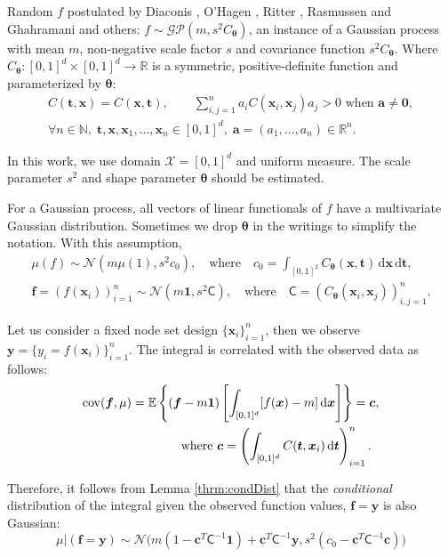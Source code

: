 \documentclass[twocolumn]{svjour3}          %
\newcommand{\bm}[1]{\boldsymbol{#1}}
\newcommand{\dif}[1]{\text{d}{#1}}
\newcommand{\D}[1]{\text{d}{#1}}
\newcommand{\Ex}{\mathbb{E}}
\newcommand{\vtheta}{{\bm{\theta}}}
\newcommand{\va}{\bm{a}}
\newcommand{\vc}{\bm{c}}
\newcommand{\vf}{\bm{f}}
\newcommand{\vt}{\bm{t}}
\newcommand{\vx}{\bm{x}}
\newcommand{\vy}{\bm{y}}
\newcommand{\vzero}{\bm{0}}
\newcommand{\vone}{\bm{1}}
\newcommand{\mC}{\mathsf{C}}
\newcommand{\cov}{{\textup{cov}}}
\newcommand{\calN}{\mathcal{N}}
\begin{document}
Random $f$ postulated by Diaconis \cite{DiaconisBayesian}, O'Hagen \cite{HagenBayes}, Ritter \cite{RiterAverage}, Rasmussen and Ghahramani \cite{RasmussenBayesian} and others: $f \sim \mathcal{GP}(m,s^2 C_\vtheta)$, an instance of a Gaussian process with mean $m$, non-negative scale factor $s$ and covariance function $s^2C_\vtheta$. Where $C_\vtheta: [0,1]^d \times [0,1]^d \to \mathbb{R} $ is a symmetric, positive-definite function and parameterized by $\vtheta$:
\begin{multline} \label{FJH:eq:CondPosDef}
C(\vt,\vx)  = C(\vx, \vt),  \qquad \sum_{i,j = 1}^n a_iC(\vx_i,\vx_j) a_j  
> 0 \text{ when } \va \ne \vzero, \\
\forall n\in \mathbb{N}, \; \vt, \vx, \vx_1, \ldots, \vx_n \in [0,1]^d, \; \va = (a_1, \ldots, a_n) \in \mathbb{R}^n.
\end{multline}

In this work, we use domain $\mathcal{X} = [0,1]^d$ and uniform measure.  The scale parameter $s^2$ and shape parameter $\vtheta$ should be estimated.

For a Gaussian process, all vectors of linear functionals of $f$ have a multivariate Gaussian distribution. Sometimes we drop $\vtheta$ in the writings to simplify the notation. With this assumption,
\begin{subequations}
\begin{align}
\mu(f) \sim \calN(m \mu(1), s^2 c_0), 
\quad\text{where}\quad
c_0 = \int_{[0,1]^2} C_\vtheta(\vx,\vt) \, \dif{\vx} \, \dif{\vt},
\\
\label{eqn:fGaussDist}
\vf  = \left( f(\vx_i)\right)_{i=1}^n \sim \calN(m \vone, s^2 \mC), 
\quad\text{where}\quad
\mC = \left(  C_\vtheta(\vx_i,\vx_j)  \right)_{i,j=1}^n.
\end{align}
\end{subequations}

Let us consider a fixed node set design $\{ \vx_i \}_{i=1}^n$, then we observe $\vy = \{y_i = f(\vx_i) \}_{i=1}^n$. 
The integral is correlated with the observed data as follows:
\begin{align*}
\cov(\vf, \mu) &= \Ex\left \{(\vf - m \vone) \left [\int_{[0,1]^d} [f(\vx) - m ] \, \D \vx  \right] \right\}  = \vc, 
\\
& \qquad \qquad \text{where } \vc = \left(  \int_{[0,1]^d} C(\vt,\vx_i) \, \D \vt \right)_{i=1}^n.
\end{align*}




Therefore,  it follows from Lemma \ref{thrm:condDist} that the \emph{conditional} distribution of the integral given the observed function values, $\vf = \vy$ is also Gaussian:
\begin{equation} \label{eqn:condInteg}
\mu | (\vf = \vy) \sim \calN \bigl(m (1 - \vc^T \mC^{-1} \vone)  + \vc^T \mC^{-1} \vy, s^2(c_0  -\vc ^T \mC^{-1} \vc) \bigr)
\end{equation}
\end{document}
